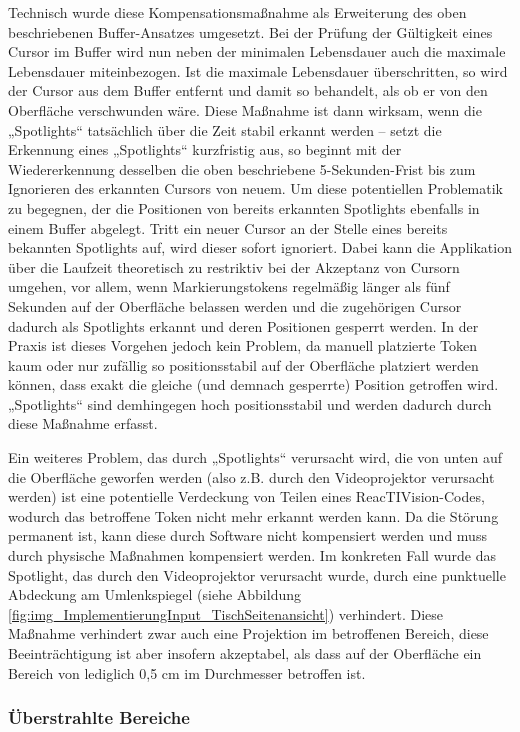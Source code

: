 Technisch wurde diese Kompensationsmaßnahme als Erweiterung des oben beschriebenen Buffer-Ansatzes umgesetzt. Bei der Prüfung der Gültigkeit eines Cursor im Buffer wird nun neben der minimalen Lebensdauer auch die maximale Lebensdauer miteinbezogen. Ist die maximale Lebensdauer überschritten, so wird der Cursor aus dem Buffer entfernt und damit so behandelt, als ob er von den Oberfläche verschwunden wäre. Diese Maßnahme ist dann wirksam, wenn die „Spotlights“ tatsächlich über die Zeit stabil erkannt werden -- setzt die Erkennung eines „Spotlights“ kurzfristig aus, so beginnt mit der Wiedererkennung desselben die oben beschriebene 5-Sekunden-Frist bis zum Ignorieren des erkannten Cursors von neuem. Um diese potentiellen Problematik zu begegnen, der die Positionen von bereits erkannten Spotlights ebenfalls in einem Buffer abgelegt. Tritt ein neuer Cursor an der Stelle eines bereits bekannten Spotlights auf, wird dieser sofort ignoriert. Dabei kann die Applikation über die Laufzeit theoretisch zu restriktiv bei der Akzeptanz von Cursorn umgehen, vor allem, wenn Markierungstokens regelmäßig länger als fünf Sekunden auf der Oberfläche belassen werden und die zugehörigen Cursor dadurch als Spotlights erkannt und deren Positionen gesperrt werden. In der Praxis ist dieses Vorgehen jedoch kein Problem, da manuell platzierte Token kaum oder nur zufällig so positionsstabil auf der Oberfläche platziert werden können, dass exakt die gleiche (und demnach gesperrte) Position getroffen wird. „Spotlights“ sind demhingegen hoch positionsstabil und werden dadurch durch diese Maßnahme erfasst.

Ein weiteres Problem, das durch „Spotlights“ verursacht wird, die von unten auf die Oberfläche geworfen werden (also z.B. durch den Videoprojektor verursacht werden) ist eine potentielle Verdeckung von Teilen eines ReacTIVision-Codes, wodurch das betroffene Token nicht mehr erkannt werden kann. Da die Störung permanent ist, kann diese durch Software nicht kompensiert werden und muss durch physische Maßnahmen kompensiert werden. Im konkreten Fall wurde das Spotlight, das durch den Videoprojektor verursacht wurde, durch eine punktuelle Abdeckung am Umlenkspiegel (siehe Abbildung \ref{fig:img_ImplementierungInput_TischSeitenansicht}) verhindert. Diese Maßnahme verhindert zwar auch eine Projektion im betroffenen Bereich, diese Beeinträchtigung ist aber insofern akzeptabel, als dass auf der Oberfläche ein Bereich von lediglich 0,5 cm im Durchmesser betroffen ist.

\subsubsection{Überstrahlte Bereiche} %
\label{ssub:überstrahlung}

